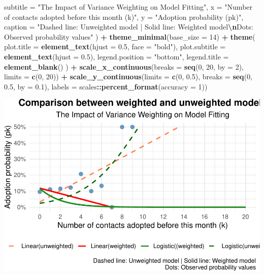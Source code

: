 \documentclass[
]{article}
\newenvironment{Shaded}{\begin{snugshade}}{\end{snugshade}}
\newcommand{\AttributeTok}[1]{\textcolor[rgb]{0.13,0.29,0.53}{#1}}
\newcommand{\DecValTok}[1]{\textcolor[rgb]{0.00,0.00,0.81}{#1}}
\newcommand{\FloatTok}[1]{\textcolor[rgb]{0.00,0.00,0.81}{#1}}
\newcommand{\FunctionTok}[1]{\textcolor[rgb]{0.13,0.29,0.53}{\textbf{#1}}}
\newcommand{\NormalTok}[1]{#1}
\newcommand{\SpecialCharTok}[1]{\textcolor[rgb]{0.81,0.36,0.00}{\textbf{#1}}}
\newcommand{\StringTok}[1]{\textcolor[rgb]{0.31,0.60,0.02}{#1}}
\begin{document}
\begin{Shaded}
\begin{Highlighting}[]
    \AttributeTok{subtitle =} \StringTok{"The Impact of Variance Weighting on Model Fitting"}\NormalTok{,}
    \AttributeTok{x =} \StringTok{"Number of contacts adopted before this month (k)"}\NormalTok{,}
    \AttributeTok{y =} \StringTok{"Adoption probability (pk)"}\NormalTok{,}
    \AttributeTok{caption =} \StringTok{"Dashed line: Unweighted model | Solid line: Weighted model}\SpecialCharTok{\textbackslash{}n}\StringTok{Dots: Observed probability values"}
\NormalTok{  ) }\SpecialCharTok{+}
  \FunctionTok{theme\_minimal}\NormalTok{(}\AttributeTok{base\_size =} \DecValTok{14}\NormalTok{) }\SpecialCharTok{+}
  \FunctionTok{theme}\NormalTok{(}
    \AttributeTok{plot.title =} \FunctionTok{element\_text}\NormalTok{(}\AttributeTok{hjust =} \FloatTok{0.5}\NormalTok{, }\AttributeTok{face =} \StringTok{"bold"}\NormalTok{),}
    \AttributeTok{plot.subtitle =} \FunctionTok{element\_text}\NormalTok{(}\AttributeTok{hjust =} \FloatTok{0.5}\NormalTok{),}
    \AttributeTok{legend.position =} \StringTok{"bottom"}\NormalTok{,}
    \AttributeTok{legend.title =} \FunctionTok{element\_blank}\NormalTok{()}
\NormalTok{  ) }\SpecialCharTok{+}
  \FunctionTok{scale\_x\_continuous}\NormalTok{(}\AttributeTok{breaks =} \FunctionTok{seq}\NormalTok{(}\DecValTok{0}\NormalTok{, }\DecValTok{20}\NormalTok{, }\AttributeTok{by =} \DecValTok{2}\NormalTok{), }\AttributeTok{limits =} \FunctionTok{c}\NormalTok{(}\DecValTok{0}\NormalTok{, }\DecValTok{20}\NormalTok{)) }\SpecialCharTok{+}
  \FunctionTok{scale\_y\_continuous}\NormalTok{(}\AttributeTok{limits =} \FunctionTok{c}\NormalTok{(}\DecValTok{0}\NormalTok{, }\FloatTok{0.5}\NormalTok{), }\AttributeTok{breaks =} \FunctionTok{seq}\NormalTok{(}\DecValTok{0}\NormalTok{, }\FloatTok{0.5}\NormalTok{, }\AttributeTok{by =} \FloatTok{0.1}\NormalTok{),}
                     \AttributeTok{labels =}\NormalTok{ scales}\SpecialCharTok{::}\FunctionTok{percent\_format}\NormalTok{(}\AttributeTok{accuracy =} \DecValTok{1}\NormalTok{))}
\end{Highlighting}
\end{Shaded}

\includegraphics{Homework-04_files/figure-latex/unnamed-chunk-8-1.pdf}
\end{document}
